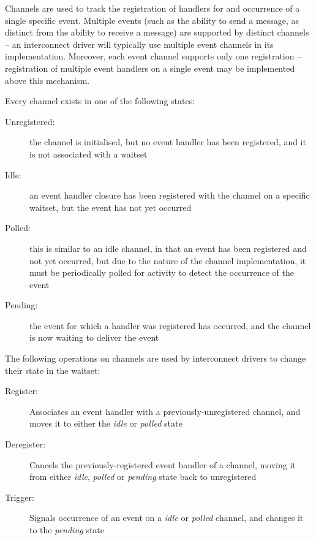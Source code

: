 \documentclass[a4paper,twoside]{report} %
\begin{document}
Channels are used to track the registration of handlers for and occurrence
of a single specific event. Multiple events (such as the ability to send a
message, as distinct from the ability to receive a message) are supported by
distinct channels -- an interconnect driver will typically use multiple event
channels in its implementation. Moreover, each event channel supports only one
registration -- registration of multiple event handlers on a single event may
be implemented above this mechanism.

Every channel exists in one of the following states:

\begin{description}
 \item[Unregistered:] the channel is initialised, but no event handler has been
              registered, and it is not associated with a waitset
 \item[Idle:] an event handler closure has been registered with the
              channel on a specific waitset, but the event has not yet occurred
 \item[Polled:] this is similar to an idle channel, in that an event has been
              registered and not yet occurred, but due to the nature of the
              channel implementation, it must be periodically polled for
              activity to detect the occurrence of the event
 \item[Pending:] the event for which a handler was registered has occurred, and
              the channel is now waiting to deliver the event
\end{description}

The following operations on channels are used by interconnect drivers to change
their state in the waitset:

\begin{description}
 \item[Register:] Associates an event handler with a previously-unregistered
               channel, and moves it to either the \emph{idle} or \emph{polled}
               state
 \item[Deregister:] Cancels the previously-registered event handler of a
               channel, moving it from either \emph{idle}, \emph{polled} or
               \emph{pending} state back to unregistered
 \item[Trigger:] Signals occurrence of an event on a \emph{idle} or
               \emph{polled} channel, and changes it to the \emph{pending} state
\end{description}
\end{document}
